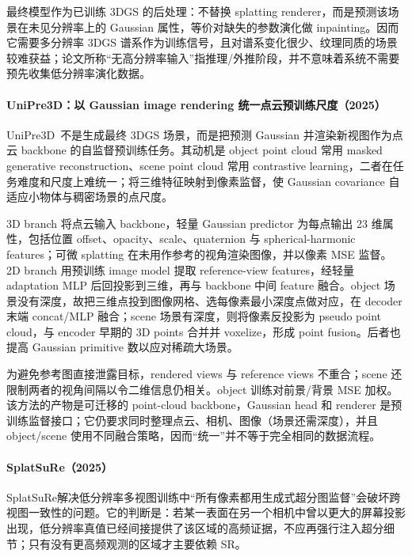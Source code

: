 最终模型作为已训练 3DGS 的后处理：不替换 splatting renderer，而是预测该场景在未见分辨率上的 Gaussian 属性，等价对缺失的参数演化做 inpainting。因而它需要多分辨率 3DGS 谱系作为训练信号，且对谱系变化很少、纹理同质的场景较难获益；论文所称“无高分辨率输入”指推理/外推阶段，并不意味着系统不需要预先收集低分辨率演化数据。

\paragraph{UniPre3D：以 Gaussian image rendering 统一点云预训练尺度（2025）\cite{2506_09952}}
UniPre3D~\cite{2506_09952}不是生成最终 3DGS 场景，而是把预测 Gaussian 并渲染新视图作为点云 backbone 的自监督预训练任务。其动机是 object point cloud 常用 masked generative reconstruction、scene point cloud 常用 contrastive learning，二者在任务难度和尺度上难统一；将三维特征映射到像素监督，使 Gaussian covariance 自适应小物体与稠密场景的点尺度。

3D branch 将点云输入 backbone，轻量 Gaussian predictor 为每点输出 23 维属性，包括位置 offset、opacity、scale、quaternion 与 spherical-harmonic features；可微 splatting 在未用作参考的视角渲染图像，并以像素 MSE 监督。2D branch 用预训练 image model 提取 reference-view features，经轻量 adaptation MLP 后回投影到三维，再与 backbone 中间 feature 融合。object 场景没有深度，故把三维点投到图像网格、选每像素最小深度点做对应，在 decoder 末端 concat/MLP 融合；scene 场景有深度，则将像素反投影为 pseudo point cloud，与 encoder 早期的 3D points 合并并 voxelize，形成 point fusion。后者也提高 Gaussian primitive 数以应对稀疏大场景。

为避免参考图直接泄露目标，rendered views 与 reference views 不重合；scene 还限制两者的视角间隔以令二维信息仍相关。object 训练对前景/背景 MSE 加权。该方法的产物是可迁移的 point-cloud backbone，Gaussian head 和 renderer 是预训练监督接口；它仍要求同时整理点云、相机、图像（场景还需深度），并且 object/scene 使用不同融合策略，因而“统一”并不等于完全相同的数据流程。

\paragraph{SplatSuRe（2025）\cite{2512_02172}}
SplatSuRe解决低分辨率多视图训练中“所有像素都用生成式超分图监督”会破坏跨视图一致性的问题。它的判断是：若某一表面在另一个相机中曾以更大的屏幕投影出现，低分辨率真值已经间接提供了该区域的高频证据，不应再强行注入超分细节；只有没有更高频观测的区域才主要依赖 SR。

